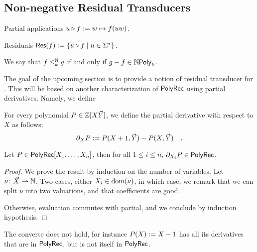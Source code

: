 \subsection{Non-negative Residual Transducers}

\begin{definition}
    Partial applications $\app{f}{u} \defined w \mapsto f(uw)$.
\end{definition}

\begin{definition}
    Residuals $\Res(f) \defined \setof{ \app{f}{u} }{u \in \Sigma^*}$.
\end{definition}
\begin{definition}
    We say that $f \natleq[k] g$ if and only if $g - f \in \NPoly[k]$.
\end{definition}

The goal of the upcoming section is to provide a notion of residual transducer
for  .
This will be based on another characterization of $\CorrectPoly$
using partial derivatives. Namely, we define

\begin{definition}
    For every polynomial $P \in \Rel[X \vec{Y}]$, we define 
    the partial derivative with respect to $X$ as follows:
    \begin{equation*}
        \partial_X P \defined P(X + 1, \vec{Y}) - P(X, \vec{Y}) \quad .
    \end{equation*}
\end{definition}

\begin{fact}
    Let $P \in \CorrectPoly[X_1, \dots, X_n]$, then
    for all $1 \leq i \leq n$,
    $\partial_{X_i} P \in \CorrectPoly$.
\end{fact}
\begin{proof}
    We prove the result by induction on the number of variables.
    Let $\nu \colon \vec{X} \topartial \Nat$.
    Two cases, either $X_i \in \dom(\nu)$,
    in which case, we remark that
    we can split $\nu$ into two valuations,
    and that coefficients are good.

    Otherwise, evaluation commutes with partial,
    and we conclude by induction hypothesis.
\end{proof}

\begin{remark}
    The converse does not hold,
    for instance $P(X) \defined X - 1$ has all its derivatives
    that are in $\CorrectPoly$, but is not itself in $\CorrectPoly$.
\end{remark}

